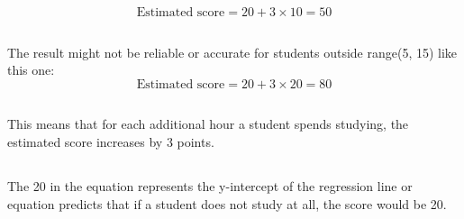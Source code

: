 \documentclass[12pt]{article}
\begin{document}
	\subsection{}	
	\[
	\text{Estimated score}=20+3 \times 10=50
	\]
	
	\subsection{}	
	The result might not be reliable or accurate for students outside range(5, 15) like this one:
	\[
	\text{Estimated score}=20+3\times20=80
	\]

	\subsection{}		
	This means that for each additional hour a student spends studying, the estimated score increases by 3 points. 
	
	\subsection{}		
	The 20 in the equation represents the y-intercept of the regression line or equation predicts that if a student does not study at all, the score would be 20. 
	
\end{document}
